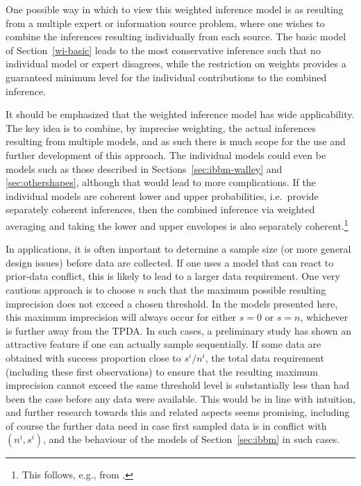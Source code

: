 One possible way in which to view this weighted inference model is
as resulting from a multiple expert or information source problem,
where one wishes to combine the inferences resulting individually
from each source. The basic model of Section~\ref{wi-basic} leads to
the most conservative inference such that no individual model or
expert disagrees, while the restriction on weights provides a
guaranteed minimum level for the individual contributions to the combined
inference.

It should be emphasized that the weighted inference model has wide applicability.
The key idea is to combine,
by imprecise weighting, the actual inferences resulting from
multiple models, and as such there is much scope for the use and
further development of this approach. The individual models could
even be models such as those described in
Sections~\ref{sec:ibbm-walley} and \ref{sec:othershapes}, although
that would lead to more complications. If the individual models
are coherent lower and upper probabilities, i.e.\ provide separately
coherent inferences, then the combined inference via weighted
averaging and taking the lower and upper envelopes is also
separately coherent.\footnote{This follows, e.g., from \textcite[\S 2.6.3f]{1991:walley}.}

In applications, it is often important to determine a sample size
(or more general design issues) before data are collected. If one
uses a model that can react to prior-data conflict, this is likely
to lead to a larger data requirement. One very cautious approach is to choose $n$ such that the maximum possible resulting
imprecision does not exceed a chosen threshold. In the models
presented here, this maximum imprecision will always occur
for either $s=0$ or $s=n$, whichever is further away from the TPDA.
In such cases, a preliminary study has shown an attractive feature if one can actually
sample sequentially. If some data are obtained with success proportion close to $s^i/n^i$, %
the total data requirement (including these first observations) %
to ensure that the resulting maximum
imprecision cannot exceed the same threshold level is substantially less
than had been the case before any data were available.
This would be in line with intuition, and further
research towards this and related aspects seems promising, including of
course the further data need in case first sampled data is in
conflict with $(n^i,s^i)$, and the behaviour of the models of Section~\ref{sec:ibbm} in such cases.

